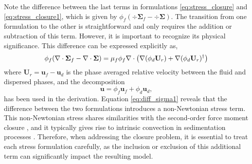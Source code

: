 Note the difference between the last terms in formulations \ref{eq:stress_closure} and \ref{eq:stress_closure1}, which is given by $\phi_f (\div \bm\Sigma_f - \div\bm\Sigma)$.
The transition from one formulation to the other is straightforward and only requires the addition or subtraction of this term. 
However, it is important to recognize its physical significance.
This difference can be expressed explicitly as,
\begin{equation}
    \phi_f (\div \bm\Sigma_f - \div\bm\Sigma) = \mu_f \phi_f \div \left(\grad (\phi _d \textbf{U}_r) + \grad (\phi _d \textbf{U}_r)^\dagger \right)
    \label{eq:diff_sigma1}
\end{equation}
where $\textbf{U}_r = \textbf{u}_f - \textbf{u}_d$ is the phase averaged relative velocity between the fluid and dispersed phases, and the decomposition 
\begin{equation}
\textbf{u} = \phi_f \textbf{u}_f + \phi_d \textbf{u}_d,
\label{eq:u_mean} 
\end{equation}
has been used in the derivation.
Equation \ref{eq:diff_sigma1} reveals that the difference between the two formulations introduces a non-Newtonian stress term.
This non-Newtonian stress shares similarities with the second-order force moment closure \citep{jackson1997locally,zhang1997momentum}, and it typically gives rise to intrinsic convection in sedimentation processes \citep{lhuillier2022}.
Therefore, when addressing the closure problem, it is essential to treat each stress formulation carefully, as the inclusion or exclusion of this additional term can significantly impact the resulting model.





